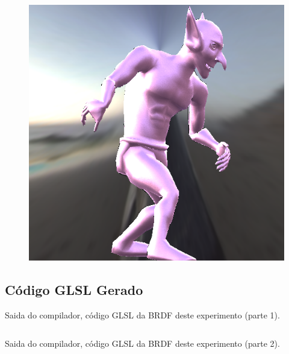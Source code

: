 \begin{figure}[H]
\endminipage\hfill
{}%
  \includegraphics[width=\linewidth]{./Imagens/brdfs/cook-torrance-alternative-goblin.png}
\endminipage
\end{figure}

\subsection{Código GLSL Gerado}
\begin{codigo}[H]
    \caption{\small Saida do compilador, código GLSL da BRDF deste experimento (parte 1). }
    \label{cod-cook-torrance-alternative-eqlang-declarations}
\begin{lstlisting}[language=C, inputencoding=utf8]
\end{lstlisting}
\end{codigo}

\begin{codigo}[H]
    \caption{\small Saida do compilador, código GLSL da BRDF deste experimento  (parte 2). }
    \label{cod-cook-torrance-alternative-eqlang}
\begin{lstlisting}[language=C, inputencoding=utf8]
\end{lstlisting}
\end{codigo}

